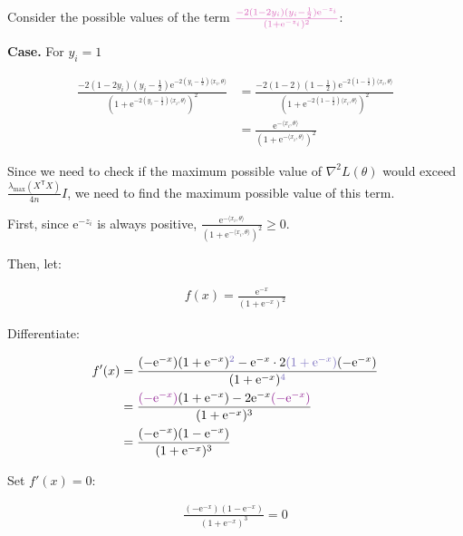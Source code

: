 \documentclass{article}
\begin{document}
Consider the possible values of the term 
$\textcolor{Thistle}{\frac{-2(1 - 2y_i)(y_i - \frac{1}{2})\mathrm{e}^{-z_i}}{(1 +\mathrm{e}^{-z_i})^2}}$:
\bigskip

\textbf{Case.} For \( y_i = 1 \)

\begin{align*}
    \frac{-2(1 - 2y_i)(y_i - \frac{1}{2})\mathrm{e}^{-2(y_i - \frac{1}{2})\langle x_i, \theta \rangle}}{(1 +\mathrm{e}^{-2(y_i - \frac{1}{2})\langle x_i, \theta \rangle})^2}
    &= \frac{-2(1 - 2)(1 - \frac{1}{2})\mathrm{e}^{-2(1 - \frac{1}{2})\langle x_i, \theta \rangle}}{(1 +\mathrm{e}^{-2(1 - \frac{1}{2})\langle x_i, \theta \rangle})^2} \\
    &= \frac{\mathrm{e}^{-\langle x_i, \theta \rangle}}{(1 +\mathrm{e}^{-\langle x_i, \theta \rangle})^2}
\end{align*}

Since we need to check if the maximum possible value of $\nabla^2 L (\theta)$ would exceed $\frac{\lambda_{\max}( X^{\mathsf{\scriptscriptstyle{T}}} X )}{4 n } I$,
we need to find the maximum possible value of this term.
\bigskip

First, since $\mathrm{e}^{-z_i}$ is always positive, $\frac{\mathrm{e}^{-\langle x_i, \theta \rangle}}{(1 +\mathrm{e}^{-\langle x_i, \theta \rangle})^2} \ge 0$.

Then, let:

\begin{align*}
    f(x) = \frac{\mathrm{e}^{-x}}{(1 +\mathrm{e}^{-x})^2}
\end{align*}

Differentiate:

\begin{align*}
    f'(x) 
    &= \frac{(-\mathrm{e}^{-x})(1 +\mathrm{e}^{-x})\textcolor{Periwinkle}{^2} - \mathrm{e}^{-x} \cdot 2\textcolor{Periwinkle}{(1 +\mathrm{e}^{-x})}(-\mathrm{e}^{-x})}{(1 +\mathrm{e}^{-x})\textcolor{Periwinkle}{^4}} \\
    &= \frac{\textcolor{Plum}{(-\mathrm{e}^{-x})}(1 +\mathrm{e}^{-x}) - 2\mathrm{e}^{-x} \textcolor{Plum}{(-\mathrm{e}^{-x})}}{(1 +\mathrm{e}^{-x})^3} \\
    &= \frac{(-\mathrm{e}^{-x})(1 - \mathrm{e}^{-x})}{(1 +\mathrm{e}^{-x})^3} \\
\end{align*}

Set $f'(x) = 0$:

\begin{align*}
    \frac{(-\mathrm{e}^{-x})(1 - \mathrm{e}^{-x})}{(1 +\mathrm{e}^{-x})^3} = 0
\end{align*}
\end{document}
